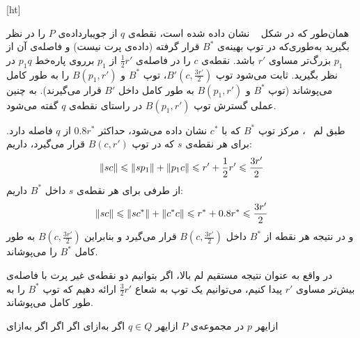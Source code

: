 [ht]



همان‌طور که در شکل ~ نشان داده شده است، نقطه‌ی $q$ از جویبارداده‌ی $P$ را در نظر بگیرید به‌طوری‌که در توپ بهینه‌ی $B^*$  قرار گرفته (داده‌ی پرت نیست) و فاصله‌ی آن از $p_1$ بزرگ‌تر مساوی $r'$ باشد. نقطه‌ی $c$ را در فاصله‌ی $\frac{1}{2}r'$ از $p_1$ برروی پاره‌خط $p_1q$ در نظر بگیرید. ثابت می‌شود توپ $B'(c, \frac{3r'}{2})$، توپ $B^*$ و $B(p_1, r')$ را به طور کامل می‌پوشاند (توپ $B^*$ و $B(p_1, r')$ به طور کامل داخل $B'$ قرار می‌گیرند). به چنین عملی گسترش توپ $B(p_1, r')$ در راستای نقطه‌ی $q$ گفته می‌شود.


طبق لم ~، مرکز‌ توپ $B^*$ که با $c^*$ نشان داده می‌شود، حداکثر $0.8r^*$ از $q$ فاصله دارد. برای هر نقطه‌ی $s$ که در توپ $B(c, r')$ قرار می‌گیرد، داریم:
$$\|{sc}\| \leqslant \|{sp_1}\|  + \|{p_1c}\| \leqslant r' + \frac{1}{2}r' \leqslant \frac{3r'}{2}$$
از طرفی برای هر نقطه‌ی $s$ داخل $B^*$  داریم:
$$\|{sc}\| \leqslant \|{sc^*}\|  + \|{c^*c}\| \leqslant r^* + 0.8r^* \leqslant \frac{3r'}{2}$$
و در نتیجه هر نقطه از $B^*$ داخل $B(c, \frac{3r'}{2})$ قرار می‌گیرد و بنابراین $B(c, \frac{3r'}{2})$ به طور کامل $B^*$ را می‌پوشاند. 



در واقع به عنوان نتیجه مستقیم لم بالا، اگر بتوانیم دو نقطه‌ی غیر پرت با فاصله‌ی بیش‌تر مساوی $r'$ پیدا کنیم، می‌توانیم یک توپ به شعاع $\frac{3}{2}r'$ ارائه دهیم که توپ $B^*$ را به طور کامل می‌پوشاند.

‌ازای{هر $p$ در مجموعه‌ی $P$}
‌ازای{هر $q \in Q$}
‌اگر{}
‌به‌ازای{}
‌اگر
‌اگر{}
‌اگر{}
‌به‌ازای{}

